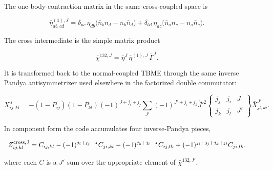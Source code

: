 \documentclass[
]{article}
\begin{document}
The one-body-contraction matrix in the same cross-coupled space is

\begin{equation}
\bar\eta^{(1),J}_{ab,cd}
=\delta_{ac}\,\eta_{db}\big(\bar n_b n_d-n_b\bar n_d\big)
+\delta_{bd}\,\eta_{ac}\big(\bar n_a n_c-n_a\bar n_c\big).
\end{equation}

The cross intermediate is the simple matrix product

\begin{equation}
\bar\chi^{132,J}=\bar\eta^J\,\bar\eta^{(1),J}\,\bar\Gamma^J .
\end{equation}

It is transformed back to the normal-coupled TBME through the same
inverse Pandya antisymmetrizer used elsewhere in the factorized double
commutator:

\begin{equation}
X^J_{ij,kl}=-(1-P_{ij})(1-P_{kl})(-1)^{J+j_i+j_j}
\sum_{J'}(-1)^{J'+j_i+j_k}\hat J'^2
\begin{Bmatrix} j_j&j_i&J\\ j_k&j_l&J'\end{Bmatrix}
\bar X^{J'}_{jl,ki} .
\end{equation}

In component form the code accumulates four inverse-Pandya pieces,

\begin{equation}
Z^{\rm cross,J}_{ij,kl}
=C_{ij,kl}
-(-1)^{j_i+j_j-J}C_{ji,kl}
-(-1)^{j_k+j_l-J}C_{ij,lk}
+(-1)^{j_i+j_j+j_k+j_l}C_{ji,lk},
\end{equation}

where each \(C\) is a \(J'\) sum over the appropriate element of
\(\bar\chi^{132,J'}\).
\end{document}

